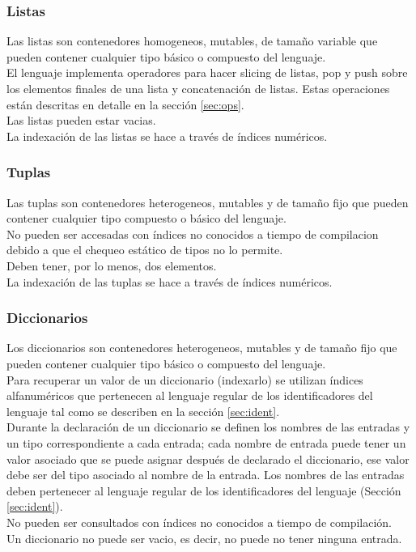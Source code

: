 \documentclass[12pt, spanish]{report}
\begin{document}
\subsubsection{Listas}
\label{sec:lists}
Las listas son contenedores homogeneos, mutables, de tama\~no variable que pueden
contener cualquier tipo b\'asico o compuesto del lenguaje.\\
\indent El lenguaje implementa operadores para hacer slicing de listas, pop y
push sobre los elementos finales de una lista y concatenaci\'on de listas. Estas
operaciones est\'an descritas en detalle en la secci\'on \ref{sec:ops}.\\
\indent Las listas pueden estar vacias.\\
\indent La indexaci\'on de las listas se hace a trav\'es de \'indices num\'ericos.

\subsubsection{Tuplas}
\label{sec:tuples}
Las tuplas son contenedores heterogeneos, mutables y de tama\~no fijo
que pueden contener cualquier tipo compuesto o b\'asico del lenguaje.\\
\indent No pueden ser accesadas con \'indices no conocidos a tiempo de compilacion debido a que
el chequeo est\'atico de tipos no lo permite.\\
\indent Deben tener, por lo menos, dos elementos.\\
\indent La indexaci\'on de las tuplas se hace a trav\'es de \'indices num\'ericos.

\subsubsection{Diccionarios}
\label{sec:dics}
Los diccionarios son contenedores heterogeneos, mutables y de tama\~no
fijo que pueden contener cualquier tipo b\'asico o compuesto del lenguaje.\\
\indent Para recuperar un valor de un diccionario (indexarlo) se
utilizan \'indices alfanum\'ericos que pertenecen al lenguaje regular de 
los identificadores del lenguaje tal como se describen en la secci\'on \ref{sec:ident}.\\
\indent Durante la declaraci\'on de un diccionario se definen los nombres de las entradas
y un tipo correspondiente a cada entrada; cada nombre de entrada puede tener un valor
asociado que se puede asignar despu\'es de declarado el diccionario, ese
valor debe ser del tipo asociado al nombre de la entrada. Los nombres
de las entradas deben pertenecer al lenguaje regular de los
identificadores del lenguaje (Secci\'on \ref{sec:ident}).\\
\indent No pueden ser consultados con \'indices no conocidos a tiempo de
compilaci\'on.\\
\indent Un diccionario no puede ser vacio, es decir, no puede no
tener ninguna entrada.\\
\end{document}
